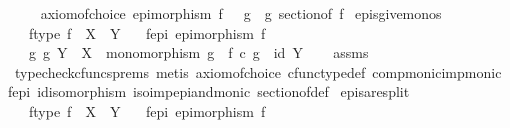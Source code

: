 \begin{isabellebody}
\isamarkupfalse%
\isanewline
\ \ \isanewline
\ \ axiom{\isacharunderscore}{\kern0pt}of{\isacharunderscore}{\kern0pt}choice{\isacharcolon}{\kern0pt}\ {\isachardoublequoteopen}epimorphism\ f\ {\isasymlongrightarrow}\ {\isacharparenleft}{\kern0pt}{\isasymexists}\ g\ {\isachardot}{\kern0pt}\ g\ sectionof\ f{\isacharparenright}{\kern0pt}{\isachardoublequoteclose}\isanewline
\isanewline
{}\isamarkupfalse%
\ epis{\isacharunderscore}{\kern0pt}give{\isacharunderscore}{\kern0pt}monos{\isacharcolon}{\kern0pt}\ \ \isanewline
\ \ \ f{\isacharunderscore}{\kern0pt}type{\isacharcolon}{\kern0pt}\ {\isachardoublequoteopen}f\ {\isacharcolon}{\kern0pt}\ X\ {\isasymrightarrow}\ Y{\isachardoublequoteclose}\isanewline
\ \ \ f{\isacharunderscore}{\kern0pt}epi{\isacharcolon}{\kern0pt}\ {\isachardoublequoteopen}epimorphism\ f{\isachardoublequoteclose}\isanewline
\ \ \ {\isachardoublequoteopen}{\isasymexists}g{\isachardot}{\kern0pt}\ g{\isacharcolon}{\kern0pt}\ Y\ {\isasymrightarrow}\ X\ {\isasymand}\ monomorphism\ g\ {\isasymand}\ f\ {\isasymcirc}\isactrlsub c\ g\ {\isacharequal}{\kern0pt}\ id\ Y{\isachardoublequoteclose}\isanewline
%
\isadelimproof
\ \ %
\endisadelimproof
%
\isatagproof
{}\isamarkupfalse%
\ assms\ \ \isanewline
\ \ \isamarkupfalse%
\ {\isacharparenleft}{\kern0pt}typecheck{\isacharunderscore}{\kern0pt}cfuncs{\isacharunderscore}{\kern0pt}prems{\isacharcomma}{\kern0pt}\ metis\ axiom{\isacharunderscore}{\kern0pt}of{\isacharunderscore}{\kern0pt}choice\ cfunc{\isacharunderscore}{\kern0pt}type{\isacharunderscore}{\kern0pt}def\ comp{\isacharunderscore}{\kern0pt}monic{\isacharunderscore}{\kern0pt}imp{\isacharunderscore}{\kern0pt}monic\ f{\isacharunderscore}{\kern0pt}epi\ id{\isacharunderscore}{\kern0pt}isomorphism\ iso{\isacharunderscore}{\kern0pt}imp{\isacharunderscore}{\kern0pt}epi{\isacharunderscore}{\kern0pt}and{\isacharunderscore}{\kern0pt}monic\ section{\isacharunderscore}{\kern0pt}of{\isacharunderscore}{\kern0pt}def{\isacharparenright}{\kern0pt}%
\endisatagproof
{\isafoldproof}%
%
\isadelimproof
\isanewline
%
\endisadelimproof
\isanewline
{}\isamarkupfalse%
\ epis{\isacharunderscore}{\kern0pt}are{\isacharunderscore}{\kern0pt}split{\isacharcolon}{\kern0pt}\isanewline
\ \ \ f{\isacharunderscore}{\kern0pt}type{\isacharcolon}{\kern0pt}\ {\isachardoublequoteopen}f\ {\isacharcolon}{\kern0pt}\ X\ {\isasymrightarrow}\ Y{\isachardoublequoteclose}\isanewline
\ \ \ f{\isacharunderscore}{\kern0pt}epi{\isacharcolon}{\kern0pt}\ {\isachardoublequoteopen}epimorphism\ f{\isachardoublequoteclose}\isanewline

\end{isabellebody}
